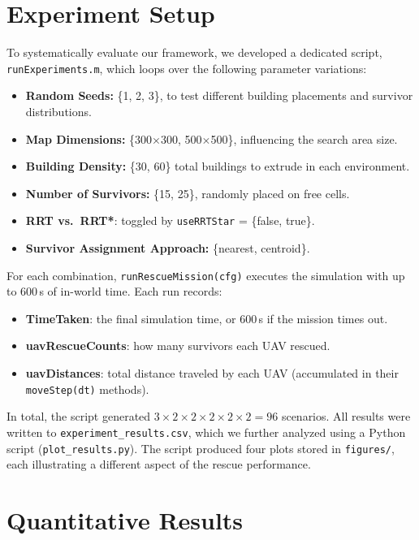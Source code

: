 \documentclass[12pt,a4paper]{report}
\begin{document}
\section{Experiment Setup}
\label{sec:experiment_setup}

To systematically evaluate our framework, we developed a dedicated script,
\texttt{runExperiments.m}, which loops over the following parameter variations:
\begin{itemize}
    \item \textbf{Random Seeds:} \{1, 2, 3\}, to test different building placements
          and survivor distributions.
    \item \textbf{Map Dimensions:} \{300$\times$300, 500$\times$500\}, influencing
          the search area size.
    \item \textbf{Building Density:} \{30, 60\} total buildings to extrude in each environment.
    \item \textbf{Number of Survivors:} \{15, 25\}, randomly placed on free cells.
    \item \textbf{RRT vs.\ RRT*}: toggled by \texttt{useRRTStar} = \{false, true\}.
    \item \textbf{Survivor Assignment Approach:} \{nearest, centroid\}.
\end{itemize}
For each combination, \texttt{runRescueMission(cfg)} executes the simulation with
up to 600\,s of in-world time. Each run records:
\begin{itemize}
    \item \textbf{TimeTaken}: the final simulation time, or 600\,s if the mission times out.
    \item \textbf{uavRescueCounts}: how many survivors each UAV rescued.
    \item \textbf{uavDistances}: total distance traveled by each UAV (accumulated in their
          \texttt{moveStep(dt)} methods).
\end{itemize}

In total, the script generated $3 \times 2 \times 2 \times 2 \times 2 \times 2 = 96$
scenarios. All results were written to \texttt{experiment\_results.csv}, which we further
analyzed using a Python script (\texttt{plot\_results.py}). The script produced four
plots stored in \texttt{figures/}, each illustrating a different aspect of the rescue
performance.

\section{Quantitative Results}
\label{sec:quantitative_results}
\end{document}
